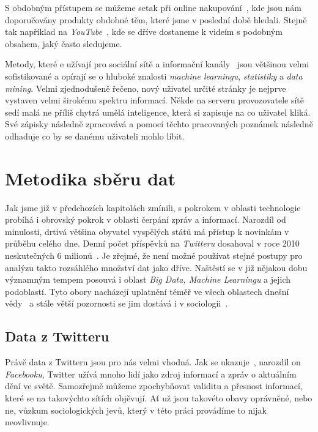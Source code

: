 \documentclass[12pt, a4paper]{article}
\numberwithin{equation}{section} 	%
\begin{document}
S obdobným přístupem se můžeme setak při online nakupování~\cite{Amazon}, kde jsou nám doporučovány produkty obdobné těm, které jsme v poslední době hledali. Stejně tak například na \textit{YouTube}~\cite{YouTube}, kde se dříve dostaneme k videím s podobným obsahem, jaký často sledujeme.

Metody, které e užívají pro sociální sítě a informační kanály~\cite{TwitterRecomendation} jsou většinou velmi sofistikované a opírají se o hluboké znalosti \textit{machine learningu}, \textit{statistiky} a \textit{data mining}. Velmi zjednodušeně řečeno, nový uživatel určité stránky je nejprve vystaven velmi širokému spektru informací. Někde na serveru provozovatele sítě sedí malá ne příliš chytrá umělá inteligence, která si zapisuje na co uživatel kliká. Své zápisky následně zpracovává a pomocí těchto pracovaných poznámek následně odhaduje co by se danému uživateli mohlo líbit.






\newpage
\section{Metodika sběru dat}
\noindent Jak jsme již v předchozích kapitolách zmínili, s pokrokem v oblasti technologie probíhá i obrovský pokrok v oblasti čerpání zpráv a informací. Narozdíl od minulosti, drtivá většina obyvatel vyspělých států má přístup k novinkám v průběhu celého dne. Denní počet příspěvků na \textit{Twitteru} dosahoval v roce 2010 neskutečných 6 milionů~\cite{Mathioudakis2010}. Je zřejmé, že není možné používat stejné postupy pro analýzu takto rozsáhlého množství dat jako dříve. Naštěstí se v již nějakou dobu významným tempem posouvá i oblast \textit{Big Data, Machine Learningu} a jejich podoblastí. Tyto obory nacházejí uplatnění téměř ve všech oblastech dnešní vědy~\cite{Huberman2012-2-15} a stále větší pozornosti se jim dostává i v sociologii~\cite{Tinati2014, McFarland2016, Shah2015-04-09}.

\subsection{Data z Twitteru}
\noindent Právě data z Twitteru jsou pro nás velmi vhodná. Jak se ukazuje~\cite{whyNotFb}, narozdíl on \textit{Facebooku}, Twitter užívá mnoho lidí jako zdroj informací a zpráv o aktuálním dění ve světě. Samozřejmě můžeme zpochybňovat validitu a přesnost informací, které se na takovýchto sítích objěvují. Ať už jsou takovéto obavy oprávněné, nebo ne, vůzkum sociologických jevů, který v této práci provádíme to nijak neovlivnuje.
\end{document}
